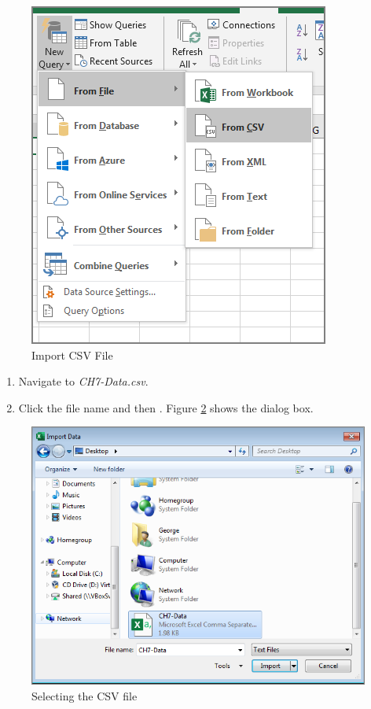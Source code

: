 \begin{figure}[H]
	\centering
	\includegraphics[width=\maxwidth{.95\linewidth}]{gfx/ch07_fig05a}
	\caption{Import CSV File}
	\label{07:fig05a}
\end{figure}

\begin{enumerate}[resume]
	\item Navigate to \textit{CH7-Data.csv}.
	\item Click the file name and then . Figure \ref{07:fig06} shows the  dialog box.
\end{enumerate}

\begin{figure}[H]
	\centering
	\includegraphics[width=\maxwidth{.95\linewidth}]{gfx/ch07_fig06}
	\caption{Selecting the CSV file}
	\label{07:fig06}
\end{figure}

